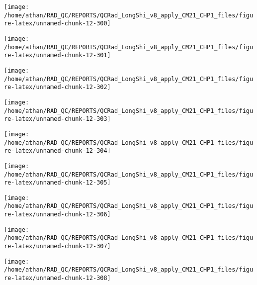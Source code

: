 \documentclass[
  10pt,
  a4paper,oneside]{article}
\begin{document}
\begin{center}\texttt{[image: /home/athan/RAD\_QC/REPORTS/QCRad\_LongShi\_v8\_apply\_CM21\_CHP1\_files/figure-latex/unnamed-chunk-12-300]} \end{center}

\begin{center}\texttt{[image: /home/athan/RAD\_QC/REPORTS/QCRad\_LongShi\_v8\_apply\_CM21\_CHP1\_files/figure-latex/unnamed-chunk-12-301]} \end{center}

\begin{center}\texttt{[image: /home/athan/RAD\_QC/REPORTS/QCRad\_LongShi\_v8\_apply\_CM21\_CHP1\_files/figure-latex/unnamed-chunk-12-302]} \end{center}

\begin{center}\texttt{[image: /home/athan/RAD\_QC/REPORTS/QCRad\_LongShi\_v8\_apply\_CM21\_CHP1\_files/figure-latex/unnamed-chunk-12-303]} \end{center}

\begin{center}\texttt{[image: /home/athan/RAD\_QC/REPORTS/QCRad\_LongShi\_v8\_apply\_CM21\_CHP1\_files/figure-latex/unnamed-chunk-12-304]} \end{center}

\begin{center}\texttt{[image: /home/athan/RAD\_QC/REPORTS/QCRad\_LongShi\_v8\_apply\_CM21\_CHP1\_files/figure-latex/unnamed-chunk-12-305]} \end{center}

\begin{center}\texttt{[image: /home/athan/RAD\_QC/REPORTS/QCRad\_LongShi\_v8\_apply\_CM21\_CHP1\_files/figure-latex/unnamed-chunk-12-306]} \end{center}

\begin{center}\texttt{[image: /home/athan/RAD\_QC/REPORTS/QCRad\_LongShi\_v8\_apply\_CM21\_CHP1\_files/figure-latex/unnamed-chunk-12-307]} \end{center}

\begin{center}\texttt{[image: /home/athan/RAD\_QC/REPORTS/QCRad\_LongShi\_v8\_apply\_CM21\_CHP1\_files/figure-latex/unnamed-chunk-12-308]} \end{center}
\end{document}
